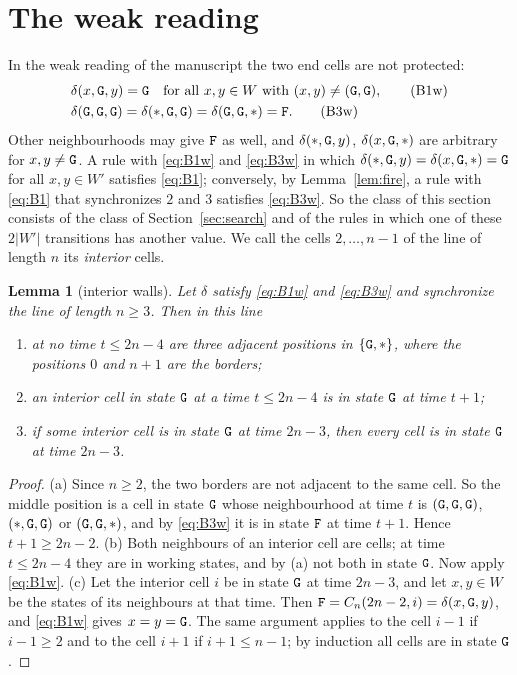 \documentclass[11pt]{article}
\newtheorem{lemma}{Lemma}
\theoremstyle{remark}
\begin{document}
\section{The weak reading}\label{sec:weak}

In the weak reading of the manuscript the two end cells are not protected:
\begin{align}
&\delta(x,\mathtt{G},y)=\mathtt{G}\quad\text{for all }x,y\in W\text{ with }(x,y)\ne(\mathtt{G},\mathtt{G}), \tag{B1w}\label{eq:B1w}\\
&\delta(\mathtt{G},\mathtt{G},\mathtt{G})=\delta(\ast,\mathtt{G},\mathtt{G})=\delta(\mathtt{G},\mathtt{G},\ast)=\mathtt{F}. \tag{B3w}\label{eq:B3w}
\end{align}
Other neighbourhoods may give $\mathtt{F}$ as well, and $\delta(\ast,\mathtt{G},y)$, $\delta(x,\mathtt{G},\ast)$ are arbitrary for
$x,y\ne\mathtt{G}$. A rule with \eqref{eq:B1w} and \eqref{eq:B3w} in which $\delta(\ast,\mathtt{G},y)=\delta(x,\mathtt{G},\ast)=\mathtt{G}$
for all $x,y\in W'$ satisfies \eqref{eq:B1}; conversely, by Lemma~\ref{lem:fire}, a rule with \eqref{eq:B1}
that synchronizes $2$ and $3$ satisfies \eqref{eq:B3w}. So the class of this section consists of the class
of Section~\ref{sec:search} and of the rules in which one of these $2|W'|$ transitions has another value.
We call the cells $2,\dots,n-1$ of the line of length $n$ its \emph{interior} cells.

\begin{lemma}[interior walls]\label{lem:iwall}
Let $\delta$ satisfy \eqref{eq:B1w} and \eqref{eq:B3w} and synchronize the line of length $n\ge3$. Then in this
line
\begin{enumerate}[label=\textup{(\alph*)},nosep]
\item at no time $t\le2n-4$ are three adjacent positions in $\{\mathtt{G},\ast\}$, where the positions $0$ and $n+1$
are the borders;
\item an interior cell in state $\mathtt{G}$ at a time $t\le2n-4$ is in state $\mathtt{G}$ at time $t+1$;
\item if some interior cell is in state $\mathtt{G}$ at time $2n-3$, then every cell is in state $\mathtt{G}$ at time
$2n-3$.
\end{enumerate}
\end{lemma}
\begin{proof}
(a) Since $n\ge2$, the two borders are not adjacent to the same cell. So the middle position is a cell in state
$\mathtt{G}$ whose neighbourhood at time $t$ is $(\mathtt{G},\mathtt{G},\mathtt{G})$, $(\ast,\mathtt{G},\mathtt{G})$ or $(\mathtt{G},\mathtt{G},\ast)$, and by
\eqref{eq:B3w} it is in state $\mathtt{F}$ at time $t+1$. Hence $t+1\ge2n-2$.
(b) Both neighbours of an interior cell are cells; at time $t\le2n-4$ they are in working states, and by (a)
not both in state $\mathtt{G}$. Now apply \eqref{eq:B1w}.
(c) Let the interior cell $i$ be in state $\mathtt{G}$ at time $2n-3$, and let $x,y\in W$ be the states of its
neighbours at that time. Then $\mathtt{F}=C_n(2n-2,i)=\delta(x,\mathtt{G},y)$, and \eqref{eq:B1w} gives $x=y=\mathtt{G}$. The same
argument applies to the cell $i-1$ if $i-1\ge2$ and to the cell $i+1$ if $i+1\le n-1$; by induction all cells
are in state $\mathtt{G}$.
\end{proof}
\end{document}
